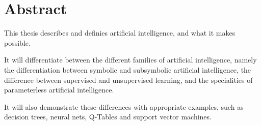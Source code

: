 \chapter*{Abstract}
This thesis describes and definies artificial intelligence, and what it makes possible. 

It will differentiate between the different families of artificial intelligence, namely the differentiation between symbolic and subsymbolic artificial intelligence, the difference between supervised and unsupervised learning, and the specialities of parameterless artificial intelligence.

It will also demonstrate these differences with appropriate examples, such as decision trees, neural nets, Q-Tables and support vector machines.


